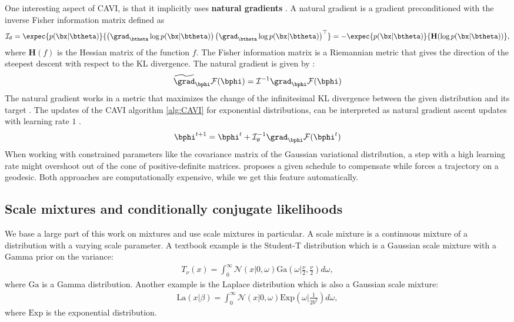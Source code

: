One interesting aspect of \ac{CAVI}, is that it implicitly uses \textbf{natural gradients} \cite{amariNaturalGradientWorks1998}.
A natural gradient is a gradient preconditioned with the inverse Fisher information matrix defined as
\begin{align}
    \mathcal{I}_\theta = \expec{p(\bx|\btheta)}{\left(\grad_{\btheta}\log p(\bx|\btheta)\right)\left(\grad_{\btheta} \log p(\bx|\btheta)\right)^\top} = -\expec{p(\bx|\btheta)}{\mathbf{H}(\log p(\bx|\btheta))},
    \label{eq:fisherinfomatrix}
\end{align}
where $\mathbf{H}(f)$ is the Hessian matrix of the function $f$.
The Fisher information matrix is a Riemannian metric that gives the direction of the steepest descent with respect to the \ac{KL} divergence.
The natural gradient is given by :
\begin{align*}
    \widetilde{\grad}_{\bphi}\mathcal{F}(\bphi) = \mathcal{I}^{-1} \grad_{\bphi}\mathcal{F}(\bphi)
\end{align*}
The natural gradient works in a metric that maximizes the change of the infinitesimal \ac{KL} divergence between the given distribution and its target \cite{salimbeniNaturalGradientsPractice2018}.
The updates of the \ac{CAVI} algorithm \ref{alg:CAVI} for exponential distributions, can be interpreted as natural gradient ascent updates with learning rate $1$ \cite{wenzelEfficientGaussianProcess2018}.
\begin{align*}
    \bphi^{t+1} = \bphi^t + \mathcal{I}^{-1}_\theta\grad_{\bphi}\mathcal{F}(\bphi^t)
\end{align*}
When working with constrained parameters like the covariance matrix of the Gaussian variational distribution, a step with a high learning rate might overshoot out of the cone of positive-definite matrices.
\citet{salimbeniNaturalGradientsPractice2018} proposes a given schedule to compensate while \citet{linHandlingPositiveDefiniteConstraint2020} forces a trajectory on a geodesic.
Both approaches are computationally expensive, while we get this feature automatically.

\subsection{Scale mixtures and conditionally conjugate likelihoods}
\label{sec:scale-mixtures}
We base a large part of this work on mixtures and use scale mixtures in particular.
A scale mixture is a continuous mixture of a distribution with a varying scale parameter.
A textbook example is the Student-T distribution which is a Gaussian scale mixture with a Gamma prior on the variance:
\begin{align*}
    T_\nu(x) = \int_{0}^\infty \mathcal{N}\left(x|0,\omega\right)\mathrm{Ga}\left(\omega|\frac{\nu}{2}, \frac{\nu}{2}\right)d\omega,
\end{align*}
where $\mathrm{Ga}$ is a Gamma distribution.
Another example is the Laplace distribution which is also a Gaussian scale mixture:
\begin{align*}
    \mathrm{La}(x|\beta) = \int_0^{\infty} \mathcal{N}(x|0,\omega)\mathrm{Exp}\left(\omega|\frac{1}{2b^2}\right)d\omega,
\end{align*}
where $\mathrm{Exp}$ is the exponential distribution.

